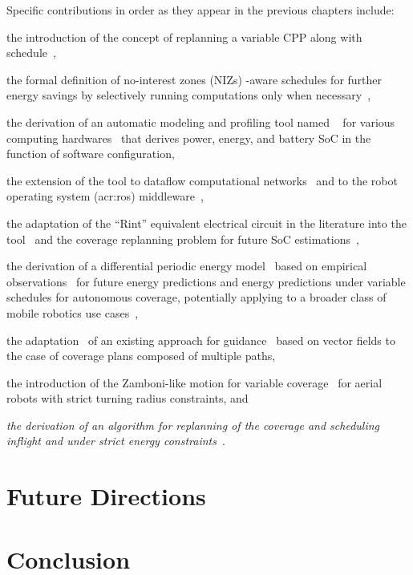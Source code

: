 Specific contributions in order as they appear in the previous chapters include:
\begin{enumerate*}[label={(\alph*)},font={\textit}]
  \item the introduction of the concept of replanning a variable CPP along with schedule~\citep{seewald202Xenergy},
  \item the formal definition of no-interest zones (NIZs) -aware schedules for further energy savings by selectively running computations only when necessary~\citep{seewald202Xenergy},
  \item the derivation of an automatic modeling and profiling tool named \powprof{}~\citep{seewald2019coarse} for various computing hardwares~\citep{powprofiler} that derives power, energy, and battery SoC in the function of software configuration,
  \item the extension of the \powprof{} tool to dataflow computational networks~\citep{seewald2019component} and to the robot operating system (\Gls{acr:ros}) middleware~\citep{zamanakos2020energy},
  \item the adaptation of the ``Rint'' equivalent electrical circuit in the literature into the \powprof{} tool~\citep{seewald2019coarse} and the coverage replanning problem for future SoC estimations~\citep{seewald202Xenergy},
  \item the derivation of a differential periodic energy model~\citep{seewald202Xenergy} based on empirical observations~\citep{seewald2020mechanical} for future energy predictions and energy predictions under variable schedules for autonomous coverage, potentially applying to a broader class of mobile robotics use cases~\citep{seewald2020beyond},
  \item the adaptation~\citep{seewald202Xenergy} of an existing approach for guidance~\citep{de2017guidance} based on vector fields to the case of coverage plans composed of multiple paths,
  \item the introduction of the Zamboni-like motion for variable coverage~\citep{seewald202Xenergy} for aerial robots with strict turning radius constraints, and
  \item {\itshape the derivation of an algorithm for replanning of the coverage and scheduling inflight and under strict energy constraints}~\citep{seewald202Xenergy}.
\end{enumerate*} 


\section{\color{red}Future Directions}
\label{sec:conc-future}


\section{\color{red}Conclusion}
\label{sec:conc-conc}

